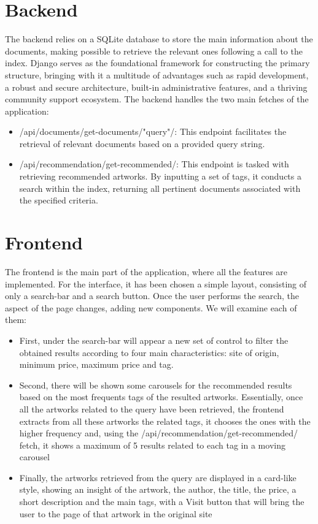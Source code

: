 \documentclass[12pt]{spieman}  %
\begin{document}
\begin{spacing}{1}
    \section{Backend}
    The backend relies on a SQLite database to store the main information about the documents, making possible to retrieve the relevant ones following a call to the index.\newline
    Django serves as the foundational framework for constructing the primary structure, bringing with it a multitude of advantages such as rapid development, a robust and secure architecture, built-in administrative features, and a thriving community support ecosystem.\newline
    The backend handles the two main fetches of the application:
    \begin{itemize}
        \item /api/documents/get-documents/"query"/: This endpoint facilitates the retrieval of relevant documents based on a provided query string.
        \item /api/recommendation/get-recommended/: This endpoint is tasked with retrieving recommended artworks. By inputting a set of tags, it conducts a search within the index, returning all pertinent documents associated with the specified criteria.
    \end{itemize}

    \section{Frontend}
    The frontend is the main part of the application, where all the features are implemented.\newline
    For the interface, it has been chosen a simple layout, consisting of only a search-bar and a search button. Once the user performs the search, the aspect of the page changes, adding new components. We will examine each of them:
    \begin{itemize}
        \item First, under the search-bar will appear a new set of control to filter the obtained results according to four main characteristics: site of origin, minimum price, maximum price and tag.
        \item Second, there will be shown some carousels for the recommended results based on the most frequents tags of the resulted artworks. Essentially, once all the artworks related to the query have been retrieved, the frontend extracts from all these artworks the related tags, it chooses the ones with the higher frequency and, using the /api/recommendation/get-recommended/ fetch, it shows a maximum of 5 results related to each tag in a moving carousel
        \item Finally, the artworks retrieved from the query are displayed in a card-like style, showing an insight of the artwork, the author, the title, the price, a short description and the main tags, with a Visit button that will bring the user to the page of that artwork in the original site
    \end{itemize}


\end{spacing}
\end{document}
